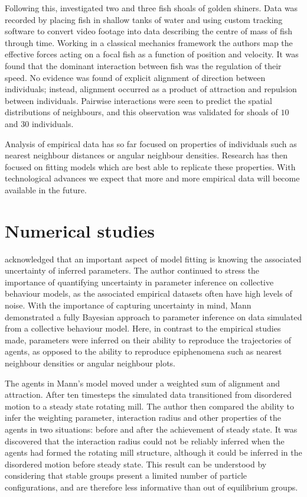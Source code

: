 Following this, \cite{katz11} investigated two and three fish shoals of golden shiners. Data was recorded by placing fish in shallow tanks of water and using custom tracking software to convert video footage into data describing the centre of mass of fish through time. Working in a classical mechanics framework the authors map the effective forces acting on a focal fish as a function of position and velocity. It was found that the dominant interaction between fish was the regulation of their speed. No evidence was found of explicit alignment of direction between individuals; instead, alignment occurred as a product of attraction and repulsion between individuals. Pairwise interactions were seen to predict the spatial distributions of neighbours, and this observation was validated for shoals of $10$ and $30$ individuals.

Analysis of empirical data has so far focused on properties of individuals such as nearest neighbour distances or angular neighbour densities. Research has then focused on fitting models which are best able to replicate these properties. With technological advances we expect that more and more empirical data will become available in the future.

\section{Numerical studies}
\label{sec:numerical_studies}

\citet{mann11} acknowledged that an important aspect of model fitting is knowing the associated uncertainty of inferred parameters. The author continued to stress the importance of quantifying uncertainty in parameter inference on collective behaviour models, as the associated empirical datasets often have high levels of noise. With the importance of capturing uncertainty in mind, Mann demonstrated a fully Bayesian approach to parameter inference on data simulated from a collective behaviour model. Here, in contrast to the empirical studies made, parameters were inferred on their ability to reproduce the trajectories of agents, as opposed to the ability to reproduce epiphenomena such as nearest neighbour densities or angular neighbour plots.

The agents in Mann's model moved under a weighted sum of alignment and attraction. After ten timesteps the simulated data transitioned from disordered motion to a steady state rotating mill. The author then compared the ability to infer the weighting parameter, interaction radius and other properties of the agents in two situations: before and after the achievement of steady state. It was discovered that the interaction radius could not be reliably inferred when the agents had formed the rotating mill structure, although it could be inferred in the disordered motion before steady state. This result can be understood by considering that stable groups present a limited number of particle configurations, and are therefore less informative than out of equilibrium groups.
